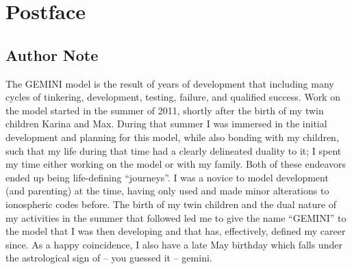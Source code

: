 \documentclass[11pt,letterpaper]{article}
\begin{document}
 




\section{Postface}

\subsection{Author Note}

The GEMINI model is the result of years of development that including many cycles of tinkering, development, testing, failure, and qualified success.  Work on the model started in the summer of 2011, shortly after the birth of my twin children Karina and Max.  During that summer I was immersed in the initial development and planning for this model, while also bonding with my children, such that my life during that time had a clearly delineated duality to it; I spent my time either working on the model or with my family.  Both of these endeavors ended up being life-defining ``journeys''.  I was a novice to model development (and parenting) at the time, having only used and made minor alterations to ionospheric codes before.  The birth of my twin children and the dual nature of my activities in the summer that followed led me to give the name ``GEMINI'' to the model that I was then developing and that has, effectively, defined my career since.  As a happy coincidence, I also have a late May birthday which falls under the astrological sign of -- you guessed it -- gemini.  
\end{document}
